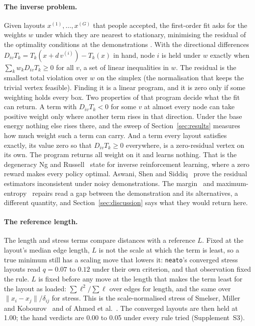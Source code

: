 \documentclass[11pt]{article}
\begin{document}
\paragraph{The inverse problem.} Given layouts $x^{(1)}, \dots, x^{(G)}$ that people
accepted, the first-order fit asks for the weights $w$ under which they are nearest to
stationary, minimising the residual of the optimality conditions at the demonstrations
\cite{keshavarz11, englert17}. With the directional differences
$D_{iv} T_k = T_k(x + d\,v^{(i)}) - T_k(x)$ in hand, node $i$ is held under $w$ exactly
when $\sum_k w_k D_{iv} T_k \ge 0$ for all $v$, a set of linear inequalities in $w$. The
residual is the smallest total violation over $w$ on the simplex (the normalisation that
keeps the trivial vertex feasible). Finding it is a linear program, and it is zero only if
some weighting holds every box. Two properties of that program decide what the fit can
return. A term with $D_{iv} T_k < 0$ for some $v$ at almost every node can take positive
weight only where another term rises in that direction. Under the base energy nothing else
rises there, and the sweep of Section~\ref{sec:results} measures how much weight such a
term can carry. And a term every layout satisfies exactly, its value zero so that $D_{iv}
T_k \ge 0$ everywhere, is a zero-residual vertex on its own. The program returns all
weight on it and learns nothing. That is the degeneracy Ng and Russell~\cite{ng00} state
for inverse reinforcement learning, where a zero reward makes every policy optimal.
Aswani, Shen and Siddiq~\cite{aswani18} prove the residual estimators inconsistent under
noisy demonstrations. The margin~\cite{ratliff06} and maximum-entropy~\cite{ziebart08}
repairs
read a gap between the demonstration and its alternatives, a different quantity, and
Section~\ref{sec:discussion} says what they would return here.

\paragraph{The reference length.} The length and stress terms compare distances with a
reference $L$. Fixed at the layout's median edge length, $L$ is not the scale at which
the term is least, so a true minimum still has a scaling move that lowers it:
\texttt{neato}'s converged stress layouts read $q = 0.07$ to $0.12$ under their own
criterion, and that observation fixed the rule. $L$ is fixed before any move at the length
that makes the term least for the layout as loaded: $\sum \ell^2 / \sum \ell$ over edges
for length, and the same over $\|x_i - x_j\| / \delta_{ij}$ for stress. This is the
scale-normalised stress of Smelser, Miller and Kobourov~\cite{smelser24} and of Ahmed et
al.~\cite{ahmed24}. The converged layouts are then held at 1.00; the hand verdicts are
0.00 to 0.05 under every rule tried (Supplement~S3).
\end{document}
